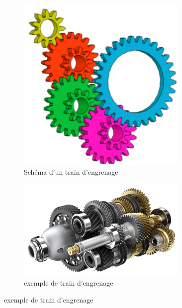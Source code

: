 \documentclass[10pt,fleqn]{article} %
\begin{document}
\begin{figure}[h]
  \centering
  \begin{subfigure}{.5\textwidth}
    \centering
    \includegraphics[width=0.9\textwidth,height=.1\textheight,keepaspectratio]{images/train_schema}
    \caption{Schéma d'un train d'engrenage}
  \end{subfigure}\hfill
  \begin{subfigure}{0.5\textwidth}
    \centering
    \includegraphics[width=0.9\textwidth,height=.1\textheight,keepaspectratio]{images/train_image}
    \caption{exemple de train d'engrenage}
  \end{subfigure}
\end{figure}
\pagebreak
\begin{aretenir}~
  \vspace{3cm}
\end{aretenir}
\end{document}
